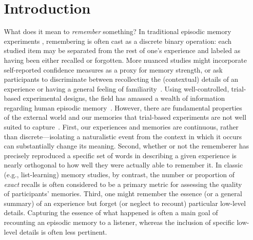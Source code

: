 \documentclass[10pt]{article}
\begin{document}
\section*{Introduction}
What does it mean to \textit{remember} something? In traditional episodic memory experiments \citep[e.g., list-learning or trial-based experiments;][]{Murd62a, Kaha96}, remembering is often cast as a discrete binary operation: each studied item may be separated from the rest of one's experience and labeled as having been either recalled or forgotten. More nuanced studies might incorporate self-reported confidence measures as a proxy for memory strength, or ask participants to discriminate between recollecting the (contextual) details of an experience or having a general feeling of familiarity~\citep{Yone02}. Using well-controlled, trial-based experimental designs, the field has amassed a wealth of information regarding human episodic memory~\citep[for review see][]{Kaha12}.  However, there are fundamental properties of the external world and our memories that trial-based experiments are not well suited to capture~\citep[for review, also see][]{KoriGold94, HukEtal18}.  First, our experiences and memories are continuous, rather than discrete---isolating a naturalistic event from the context in which it occurs can substantially change its meaning.  Second, whether or not the rememberer has precisely reproduced a specific set of words in describing a given experience is nearly orthogonal to how well they were actually able to remember it.  In classic (e.g., list-learning) memory studies, by contrast, the number or proportion of \textit{exact} recalls is often considered to be a primary metric for assessing the quality of participants' memories.  Third, one might remember the essence (or a general summary) of an experience but forget (or neglect to recount) particular low-level details.  Capturing the essence of what happened is often a main goal of recounting an episodic memory to a listener, whereas the inclusion of specific low-level details is often less pertinent.
\end{document}
